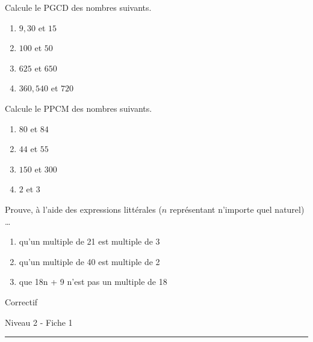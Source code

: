 \documentclass[12pt,parskip=half-, twoside=semi]{scrartcl}
\begin{document}
        \begin{exercise}
          Calcule le PGCD des nombres suivants. 
            \begin{enumerate}[cols=2]
              \item $9,30$ et $15$
              \item $100$ et $50$
              \item $625$ et $650$
              \item $360, 540$ et $720$
            \end{enumerate}
        \end{exercise}
 
        \begin{exercise}
          Calcule le PPCM des nombres suivants.
            \begin{enumerate}[cols=2]
              \item $80$ et $84$
              \item $44$ et $55$
              \item $150$ et $300$
              \item $2$ et $3$
            \end{enumerate}
        \end{exercise}

        \begin{exercise}
          Prouve, à l'aide des expressions littérales (\(n\) représentant n'importe quel naturel) \dots 
          \begin{enumerate}
            \item qu'un multiple de 21 est multiple de 3
            \item qu'un multiple de 40 est multiple de 2 
            \item que 18n + 9 n'est pas un multiple de 18
          \end{enumerate}
        \end{exercise}

\newpage

\begin{center}
  \bfseries
  \begin{Huge}
    Correctif
  \end{Huge}
  \smallbreak
  \begin{large}
    Niveau 2  - Fiche 1
  \end{large}
  \smallbreak
  \rule[10pt]{.5\linewidth}{1 pt}
\end{center}

\setcounter{exercise}{0}
      
\end{document}
